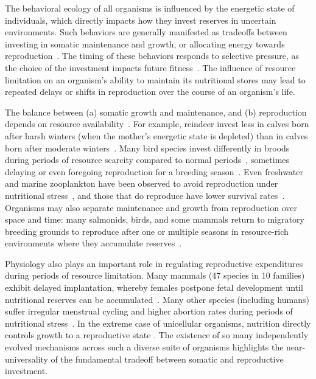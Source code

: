 \documentclass[twocolumn,preprintnumbers,amsmath,amssymb,superscriptaddress]{revtex4}
\begin{document}
\maketitle




The behavioral ecology of all organisms is influenced by the energetic state of individuals, which directly impacts how they invest reserves in uncertain environments.
Such behaviors are generally manifested as tradeoffs between investing in somatic maintenance and growth, or allocating energy towards reproduction~\citep{Martin:1987dl,Kirk:1997cc,Kempes:2012hy}.
The timing of these behaviors responds to selective pressure, as the choice of the investment impacts future fitness~\citep{Mangel:1988uaa,Mangel:2014kz,Yeakel:2013hi}.
The influence of resource limitation on an organism's ability to maintain its nutritional stores may lead to repeated delays or shifts in reproduction over the course of an organism's life.

The balance between (a) somatic growth and maintenance, and (b) reproduction depends on resource availability~\citep{Morris:1987eo}.
For example, reindeer invest less in calves born after harsh winters (when the mother's energetic state is depleted) than in calves born after moderate winters~\citep{Tveraa:2003fq}.
Many bird species invest differently in broods during periods of resource scarcity compared to normal periods~\citep{Daan:1988va,Jacot:2009dv}, sometimes delaying or even foregoing reproduction for a breeding season~\citep{Martin:1987dl,Stearns:1989ip,Barboza:2002in}.
Even freshwater and marine zooplankton have been observed to avoid reproduction under nutritional stress~\citep{Threlkeld:1976ih}, and those that do reproduce have lower survival rates~\citep{Kirk:1997cc}.
Organisms may also separate maintenance and growth from reproduction over space and time: many salmonids, birds, and some mammals return to migratory breeding grounds to reproduce after one or multiple seasons in resource-rich environments where they accumulate reserves~\citep{Weber:1998jg,Mduma:1999cp,Moore:2014hi}.

Physiology also plays an important role in regulating reproductive expenditures during periods of resource limitation.
Many mammals (47 species in 10 families) exhibit delayed implantation, whereby females postpone fetal development until nutritional reserves can be accumulated~\citep{Mead:1989dt,Sandell:1990kw}.
Many other species (including humans) suffer irregular menstrual cycling and higher abortion rates during periods of nutritional stress~\citep{Bulik:1999eo,Trites:2003cc}.
In the extreme case of unicellular organisms, nutrition directly controls growth to a reproductive state \citep{Glazier:2009hq,Kempes:2012hy}. The existence of so many independently evolved mechanisms across such a diverse suite of organisms highlights the near-universality of the fundamental tradeoff between somatic and reproductive investment.
\end{document}
